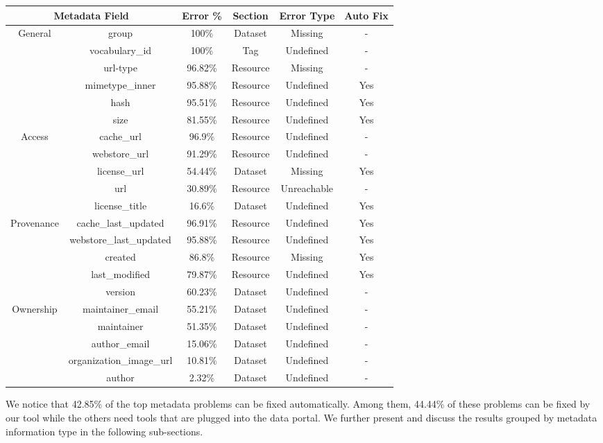 \begin{table}[ht]
\begin{center}
\begin{tabular}{|c|c|c|c|c|c|}
\hline
\multicolumn{2}{|c|}{Metadata Field} & Error \% & Section & Error Type & Auto Fix\tabularnewline
\hline
\hline
\multirow{6}{*}{General } & group & 100\% & Dataset & Missing & -\tabularnewline
\cline{2-6}
 & vocabulary\_id & 100\% & Tag & Undefined & -\tabularnewline
\cline{2-6}
 & url-type & 96.82\% & Resource & Missing & -\tabularnewline
\cline{2-6}
 & mimetype\_inner & 95.88\% & Resource & Undefined & Yes\tabularnewline
\cline{2-6}
 & hash & 95.51\% & Resource & Undefined & Yes\tabularnewline
\cline{2-6}
 & size & 81.55\% & Resource & Undefined & Yes\tabularnewline
\hline
\multirow{5}{*}{Access } & cache\_url & 96.9\% & Resource & Undefined & -\tabularnewline
\cline{2-6}
 & webstore\_url & 91.29\% & Resource & Undefined & -\tabularnewline
\cline{2-6}
 & license\_url & 54.44\% & Dataset & Missing & Yes\tabularnewline
\cline{2-6}
 & url & 30.89\% & Resource & Unreachable & -\tabularnewline
\cline{2-6}
 & license\_title & 16.6\% & Dataset & Undefined & Yes\tabularnewline
\hline
\multirow{5}{*}{Provenance } & cache\_last\_updated & 96.91\% & Resource & Undefined & Yes\tabularnewline
\cline{2-6}
 & webstore\_last\_updated & 95.88\% & Resource & Undefined & Yes\tabularnewline
\cline{2-6}
 & created & 86.8\% & Resource & Missing & Yes\tabularnewline
\cline{2-6}
 & last\_modified & 79.87\% & Resource & Undefined & Yes\tabularnewline
\cline{2-6}
 & version & 60.23\% & Dataset & Undefined & -\tabularnewline
\hline
\multirow{5}{*}{Ownership } & maintainer\_email & 55.21\% & Dataset & Undefined & -\tabularnewline
\cline{2-6}
 & maintainer & 51.35\% & Dataset & Undefined & -\tabularnewline
\cline{2-6}
 & author\_email & 15.06\% & Dataset & Undefined & -\tabularnewline
\cline{2-6}
 & organization\_image\_url & 10.81\% & Dataset & Undefined & -\tabularnewline
\cline{2-6}
 & author & 2.32\% & Dataset & Undefined & -\tabularnewline
\hline
\end{tabular}
\label{table:top_metadata_fields_errors}
\end{center}
\end{table}

We notice that 42.85\% of the top metadata problems can be fixed automatically. Among them, 44.44\% of these problems can be fixed by our tool while the others need tools that are plugged into the data portal. We further present and discuss the results grouped by metadata information type in the following sub-sections.


